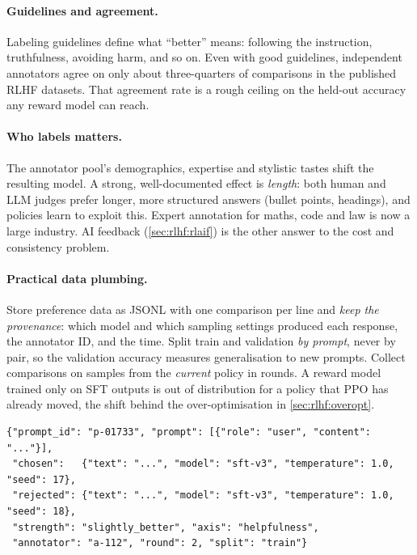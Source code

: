 \paragraph{Guidelines and agreement.} Labeling guidelines define what ``better'' means: following the
instruction, truthfulness, avoiding harm, and so on. Even with good guidelines, independent
annotators agree on only about three-quarters of comparisons in the published RLHF datasets.
That agreement rate is a rough ceiling on the held-out accuracy any reward model can reach.

\paragraph{Who labels matters.} The annotator pool's demographics, expertise and stylistic tastes
shift the resulting model. A strong, well-documented effect is \emph{length}: both human
and LLM judges prefer longer, more structured answers (bullet points, headings), and
policies learn to exploit this. Expert annotation for maths, code and law is now a large
industry. AI feedback (\cref{sec:rlhf:rlaif}) is the other answer to the cost and consistency problem.

\paragraph{Practical data plumbing.} Store preference data as JSONL with one comparison per line and
\emph{keep the provenance}: which model and which sampling settings produced each response, the annotator ID, and
the time. Split train and validation \emph{by prompt}, never by pair, so the validation accuracy
measures generalisation to new prompts. Collect comparisons on samples from the \emph{current}
policy in rounds. A reward model trained only on SFT outputs is out of distribution for a
policy that PPO has already moved, the shift behind the over-optimisation in
\cref{sec:rlhf:overopt}.

\begin{lstlisting}[style=plain,caption={One line of a preference dataset, with the metadata that later turns out to matter.},label={lst:rlhf:jsonl}]
{"prompt_id": "p-01733", "prompt": [{"role": "user", "content": "..."}],
 "chosen":   {"text": "...", "model": "sft-v3", "temperature": 1.0, "seed": 17},
 "rejected": {"text": "...", "model": "sft-v3", "temperature": 1.0, "seed": 18},
 "strength": "slightly_better", "axis": "helpfulness",
 "annotator": "a-112", "round": 2, "split": "train"}
\end{lstlisting}


